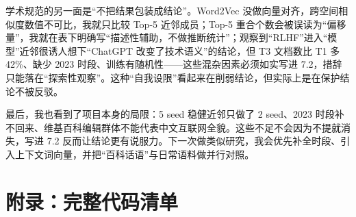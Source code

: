 \documentclass[12pt,a4paper]{article}
\begin{document}
学术规范的另一面是“不把结果包装成结论”。Word2Vec 没做向量对齐，跨空间相似度数值不可比，我就只比较 Top-5 近邻成员；Top-5 重合个数会被误读为“偏移量”，我就在表下明确写“描述性辅助，不做推断统计”；观察到“RLHF”进入“模型”近邻很诱人想下“ChatGPT 改变了技术语义”的结论，但 T3 文档数比 T1 多 42\%、缺少 2023 时段、训练有随机性——这些混杂因素必须如实写进 7.2，措辞只能落在“探索性观察”。这种“自我设限”看起来在削弱结论，但实际上是在保护结论不被反驳。

最后，我也看到了项目本身的局限：5 seed 稳健近邻只做了 2 seed、2023 时段补不回来、维基百科编辑群体不能代表中文互联网全貌。这些不足不会因为不提就消失，写进 7.2 反而让结论更有说服力。下一次做类似研究，我会优先补全时段、引入上下文词向量，并把“百科话语”与日常语料做并行对照。

\section{附录：完整代码清单}
\end{document}
